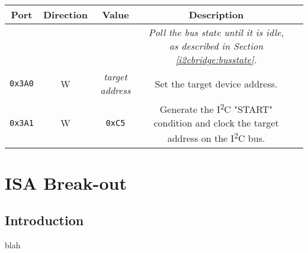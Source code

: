 \documentclass[twoside,10pt,letterpaper]{refart}
\newcommand{\itwoc}{I\textsuperscript{2}C}
\begin{document}
\begin{center}
    \begin{tabular}{ c|c|c|c|c }
        \textbf{Port} & \textbf{Direction} & \textbf{Value} & \textbf{Description} \\
        \hline
        & & & \textit{Poll the bus state until it is idle, as described in Section \ref{i2cbridge:busstate}.} \\
        \texttt{0x3A0} & W & \textit{target address} & Set the target device address. \\
        \texttt{0x3A1} & W & \texttt{0xC5} & Generate the \itwoc{} "START" condition and clock the target address on the \itwoc{} bus. \\
    \end{tabular}
\end{center}

\newpage

\section{ISA Break-out}

\subsection{Introduction}
blah
\end{document}
